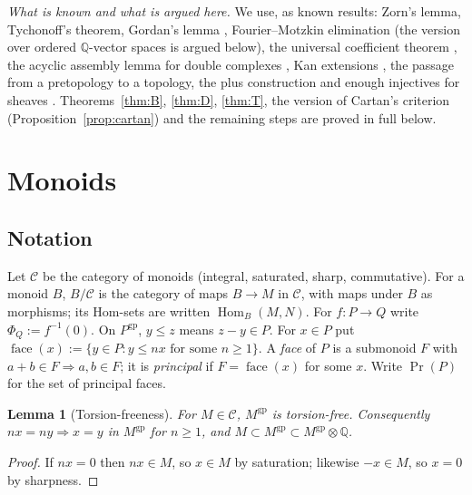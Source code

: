 \documentclass[11pt]{article}
\newtheorem{lemma}[theorem]{Lemma}
\theoremstyle{definition}
\theoremstyle{remark}
\newcommand{\QQ}{\mathbb{Q}}
\newcommand{\cC}{\mathcal{C}}
\newcommand{\gp}{\mathrm{gp}}
\newcommand{\face}{\operatorname{face}}
\newcommand{\Prin}{\operatorname{Pr}}
\newcommand{\Hom}{\operatorname{Hom}}
\begin{document}
\emph{What is known and what is argued here.} We use, as known results: Zorn's lemma, Tychonoff's theorem, Gordan's lemma \cite{Gordan,Fulton}, Fourier--Motzkin elimination \cite{Schrijver} (the version over ordered $\QQ$-vector spaces is argued below), the universal coefficient theorem \cite{Hatcher}, the acyclic assembly lemma for double complexes \cite{Weibel}, Kan extensions \cite{MacLane}, the passage from a pretopology to a topology, the plus construction and enough injectives for sheaves \cite{SGA4,Tohoku}. Theorems~\ref{thm:B}, \ref{thm:D}, \ref{thm:T}, the version of Cartan's criterion (Proposition~\ref{prop:cartan}) and the remaining steps are proved in full below.

\section{Monoids}\label{sec:monoids}

\subsection{Notation}
Let $\cC$ be the category of monoids (integral, saturated, sharp, commutative). For a monoid $B$, $B/\cC$ is the category of maps $B\to M$ in $\cC$, with maps under $B$ as morphisms; its Hom-sets are written $\Hom_B(M,N)$. For $f\colon P\to Q$ write $\Phi_Q:=f^{-1}(0)$. On $P^{\gp}$, $y\le z$ means $z-y\in P$. For $x\in P$ put $\face(x):=\{y\in P: y\le nx\text{ for some }n\ge1\}$. A \emph{face} of $P$ is a submonoid $F$ with $a+b\in F\Rightarrow a,b\in F$; it is \emph{principal} if $F=\face(x)$ for some $x$. Write $\Prin(P)$ for the set of principal faces.

\begin{lemma}[Torsion-freeness]\label{lem:tf}
For $M\in\cC$, $M^{\gp}$ is torsion-free. Consequently $nx=ny\Rightarrow x=y$ in $M^{\gp}$ for $n\ge1$, and $M\subset M^{\gp}\subset M^{\gp}\otimes\QQ$.
\end{lemma}
\begin{proof}
If $nx=0$ then $nx\in M$, so $x\in M$ by saturation; likewise $-x\in M$, so $x=0$ by sharpness.
\end{proof}
\end{document}
